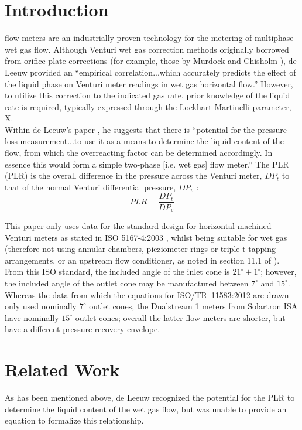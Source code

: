 \documentclass[journal]{IEEEtran}
\begin{document}
\section{Introduction}
 flow meters are an industrially proven technology for the metering of multiphase wet gas flow. Although Venturi wet gas correction methods originally borrowed from orifice plate corrections (for example, those by Murdock \cite{Murdock1962} and Chisholm \cite{Chisholm1977}), de Leeuw \cite{DeLeeuw1997} provided an ``empirical correlation...which accurately predicts the effect of the liquid phase on Venturi meter readings in wet gas horizontal flow.''  However, to utilize this correction to the indicated gas rate, prior knowledge of the liquid rate is required, typically expressed through the Lockhart-Martinelli parameter, \acrshort{X}.\\

Within de Leeuw's paper \cite{DeLeeuw1997}, he suggests that there is ``potential for the pressure loss measurement...to use it as a means to determine the liquid content of the flow, from which the overreacting factor can be determined accordingly. In essence this would form a simple two-phase [i.e. wet gas] flow meter.''  The \acrlong{PLR} (PLR) is the overall difference in the pressure across the Venturi meter, $DP_{t}$ to that of the normal Venturi differential pressure, $DP_{v}$ :
\begin{equation}
    PLR = \frac{DP_{t}}{DP_{v}}
\end{equation}

This paper only uses data for the standard design for horizontal machined Venturi meters as stated in ISO 5167-4:2003 \cite{2003ISOTubes}, whilst being suitable for wet gas (therefore not using annular chambers, pieziometer rings or triple-t tapping arrangements, or an upstream flow conditioner, as noted in section 11.1 of \cite{Reader-Harris2015}).  From this ISO standard, the included angle of the inlet cone is $21^{\circ} \pm 1^{\circ}$; however, the included angle of the outlet cone may be manufactured between $7^{\circ}$ and $15^{\circ}$.  Whereas the data from which the equations for ISO/TR~11583:2012 \cite{2012ISO/TRConduits} are drawn only used nominally $7^{\circ}$ outlet cones, the Dualstream 1 meters from Solartron ISA have nominally $15^{\circ}$ outlet cones; overall the latter flow meters are shorter, but have a different pressure recovery envelope.

\section{Related Work}
As has been mentioned above, de Leeuw \cite{DeLeeuw1997} recognized the potential for the \acrshort{PLR} to determine the liquid content of the wet gas flow, but was unable to provide an equation to formalize this relationship.
\end{document}
